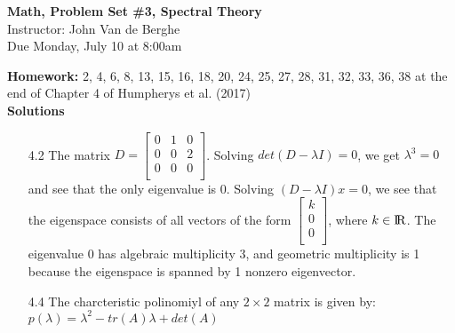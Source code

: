 \documentclass[letterpaper,12pt]{article}
\theoremstyle{definition}
\begin{document}
\begin{flushleft}
   \textbf{\large{Math, Problem Set \#3, Spectral Theory}} \\[5pt] Instructor: John Van de Berghe \\[5pt]
   Due Monday, July 10 at 8:00am
\end{flushleft}
\textbf{Homework:} 2, 4, 6, 8, 13, 15, 16, 18, 20, 24, 25, 27, 28, 31, 32, 33, 36, 38 at the end of Chapter 4 of Humpherys et al. (2017) \\

\textbf{Solutions}
\begin{enumerate}
\item[4.2] The matrix $D = \begin{bmatrix}
           0 & 1 & 0\\
           0 & 0 & 2\\
           0 & 0 & 0\\
         \end{bmatrix}$. Solving $det(D- \lambda I) = 0$, we get $\lambda^3 = 0$ and see that the only eigenvalue is 0. Solving $(D- \lambda I)x = 0$, we see that the eigenspace consists of all vectors of the form $\begin{bmatrix}
           k\\
           0\\
           0\\
         \end{bmatrix}$, where $k \in {\rm I\!R}$. The eigenvalue 0 has algebraic multiplicity 3, and geometric multiplicity is 1 because the eigenspace is spanned by 1 nonzero eigenvector.\\
         
\item[4.4] The charcteristic polinomiyl of any $2\times 2$ matrix is given by: \\ $p(\lambda)=\lambda^2-tr(A)\lambda + det(A)$


\end{enumerate}
\end{document}
